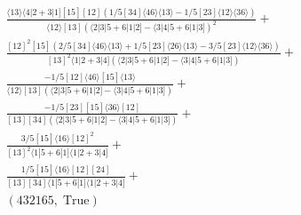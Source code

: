 \documentclass[varwidth, border=5pt]{standalone}
\begin{document}
\begin{my}
$\begin{gathered}
\scriptscriptstyle\frac{⟨13⟩⟨4|2+3|1][15][12](1/5[34]⟨46⟩⟨13⟩-1/5[23]⟨12⟩⟨36⟩)}{⟨12⟩[13](⟨2|3|5+6|1|2]-⟨3|4|5+6|1|3])^2}+\\
\scriptscriptstyle\frac{[12]^2[15](2/5[34]⟨46⟩⟨13⟩+1/5[23]⟨26⟩⟨13⟩-3/5[23]⟨12⟩⟨36⟩)}{[13]^2⟨1|2+3|4](⟨2|3|5+6|1|2]-⟨3|4|5+6|1|3])}+\\
\scriptscriptstyle\frac{-1/5[12]⟨46⟩[15]⟨13⟩}{⟨12⟩[13](⟨2|3|5+6|1|2]-⟨3|4|5+6|1|3])}+\\
\scriptscriptstyle\frac{-1/5[23][15]⟨36⟩[12]}{[13][34](⟨2|3|5+6|1|2]-⟨3|4|5+6|1|3])}+\\
\scriptscriptstyle\frac{3/5[15]⟨16⟩[12]^2}{[13]^2⟨1|5+6|1]⟨1|2+3|4]}+\\
\scriptscriptstyle\frac{1/5[15]⟨16⟩[12][24]}{[13][34]⟨1|5+6|1]⟨1|2+3|4]}+\\
\scriptscriptstyle(432165,\;\text{True})\phantom{+}
\end{gathered}$
\end{my}
\end{document}
